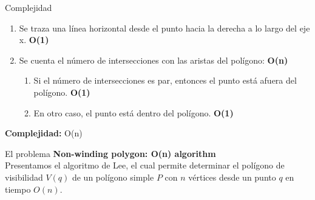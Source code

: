 \documentclass[aspectratio=169,xcolor=dvipsnames, t]{beamer}
\begin{document}
\begin{frame}[c]{Complejidad}
  \begin{enumerate}
  \item Se traza una línea horizontal desde el punto hacia la derecha a lo largo del eje x. \textbf{O(1)}
  \item Se cuenta el número de intersecciones con las aristas del polígono:  \textbf{O(n)}
    \begin{enumerate}
    \item Si el número de intersecciones es par, entonces el punto está afuera del polígono.  \textbf{O(1)}
    \item En otro caso, el punto está dentro del polígono.  \textbf{O(1)}
    \end{enumerate}
  \end{enumerate}
  \textbf{Complejidad:} O(n)
\end{frame}



\begin{frame}{El problema}
\textbf{Non-winding polygon: O(n) algorithm}\\
    \vspace{0.5cm}
    Presentamos el algoritmo de Lee, el cual permite determinar el polígono de visibilidad $V(q)$ de un polígono simple $P$ con $n$ vértices desde un punto $q$ en tiempo $O(n)$.
\end{frame}

\end{document}
